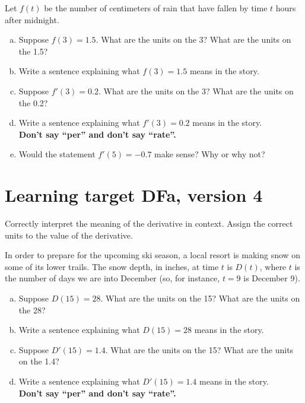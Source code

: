 Let $f(t)$ be the number of centimeters of rain that have fallen by time $t$ hours after midnight.
\begin{enumerate}[(a)]

\item Suppose $f(3) = 1.5$. What are the units on the 3? What are the units on the 1.5?
\vfill
\item Write a sentence explaining what $f(3) = 1.5$ means in the story.
\vfill

\item Suppose $f'(3) = 0.2$. What are the units on the 3? What are the units on the 0.2?
\vfill
\item Write a sentence explaining what $f'(3) = 0.2$ means in the story.\\
\textbf{Don't say ``per'' and don't say ``rate''.}

\vfill
\item Would the statement $f'(5) = -0.7$ make sense?
Why or why not?

\end{enumerate}

\pagebreak

\section{Learning target DFa, version 4}

Correctly interpret the meaning of the derivative in context. Assign the correct units to the value of the derivative.

\hrulefill

In order to prepare for the upcoming ski season, a local resort is making snow on some of its lower trails. The snow depth, in inches, at time $t$ is $D(t)$, where $t$ is the number of days we are into December (so, for instance, $t=9$ is December 9). 

\begin{enumerate}[(a)]
\item Suppose $D(15)=28$. What are the units on the 15? What are the units on the 28?
\vfill
\item Write a sentence explaining what $D(15)=28$ means in the story.
\vfill

\item Suppose $D'(15) = 1.4$. What are the units on the 15? What are the units on the 1.4?
\vfill
\item Write a sentence explaining what $D'(15) = 1.4$ means in the story.\\
\textbf{Don't say ``per'' and don't say ``rate''.}

\vfill
\end{enumerate}


